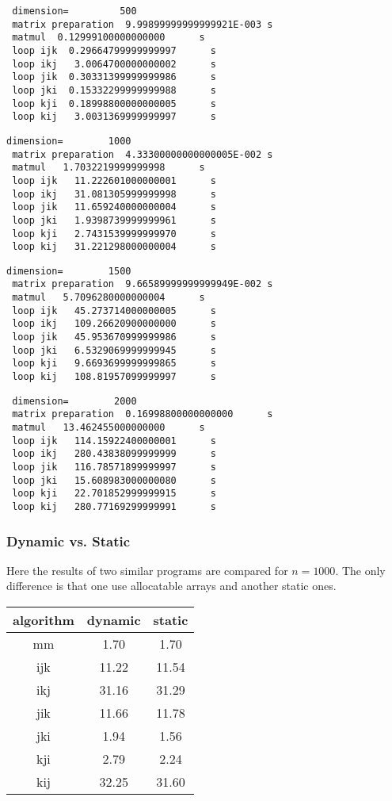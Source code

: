 \documentclass{beamer}
\begin{document}
\begin{frame} [fragile] 
\begin{verbatim}
 dimension=         500
 matrix preparation  9.99899999999999921E-003 s
 matmul  0.12999100000000000      s
 loop ijk  0.29664799999999997      s
 loop ikj   3.0064700000000002      s
 loop jik  0.30331399999999986      s
 loop jki  0.15332299999999988      s
 loop kji  0.18998800000000005      s
 loop kij   3.0031369999999997      s
\end{verbatim}
\end{frame}

\begin{frame} [fragile] 
\begin{verbatim}
dimension=        1000
 matrix preparation  4.33300000000000005E-002 s
 matmul   1.7032219999999998      s
 loop ijk   11.222601000000001      s
 loop ikj   31.081305999999998      s
 loop jik   11.659240000000004      s
 loop jki   1.9398739999999961      s
 loop kji   2.7431539999999970      s
 loop kij   31.221298000000004      s
\end{verbatim}
\end{frame}
\begin{frame} [fragile] 
\begin{verbatim}
dimension=        1500
 matrix preparation  9.66589999999999949E-002 s
 matmul   5.7096280000000004      s
 loop ijk   45.273714000000005      s
 loop ikj   109.26620900000000      s
 loop jik   45.953670999999986      s
 loop jki   6.5329069999999945      s
 loop kji   9.6693699999999865      s
 loop kij   108.81957099999997      s
\end{verbatim}
\end{frame}
\begin{frame} [fragile] 
\begin{verbatim}
 dimension=        2000
 matrix preparation  0.16998800000000000      s
 matmul   13.462455000000000      s
 loop ijk   114.15922400000001      s
 loop ikj   280.43838099999999      s
 loop jik   116.78571899999997      s
 loop jki   15.608983000000080      s
 loop kji   22.701852999999915      s
 loop kij   280.77169299999991      s
\end{verbatim}
\end{frame}
\begin{frame}
\frametitle{Dynamic vs. Static}
    Here  the results of two similar programs are compared for $n=1000$.
    The only difference is that one use allocatable arrays and another
    static ones.

\begin{tabular}{|c|c|c|} \hline
algorithm & dynamic & static\\ \hline
mm  & 1.70  & 1.70 \\ \hline 
ijk & 11.22 & 11.54 \\ \hline
ikj & 31.16 & 31.29 \\ \hline
jik & 11.66 & 11.78 \\ \hline
jki & 1.94  & 1.56  \\ \hline
kji & 2.79  & 2.24  \\ \hline
kij & 32.25 & 31.60 \\ \hline
\end{tabular}

\end{frame}
\end{document}
